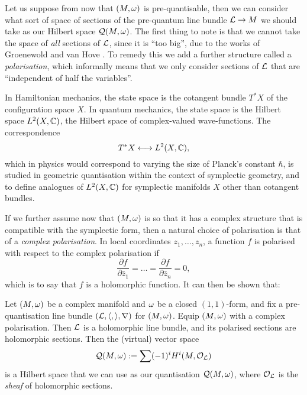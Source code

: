 Let us suppose from now that $(M,\omega)$ is pre-quantisable, then we can consider what sort of space of sections of the pre-quantum line bundle $\mathcal{L}\rightarrow M$ we should take as our Hilbert space $\mathcal{Q}(M,\omega)$. The first thing to note is that we cannot take the space of \emph{all} sections of $\mathcal{L}$, since it is ``too big'', due to the works of Groenewold \cite{Gro46} and van Hove \cite{Hov51}. To remedy this we add a further structure called a \emph{polarisation}, which informally means that we only consider sections of $\mathcal{L}$ that are ``independent of half the variables''.

\begin{rmk}
	In Hamiltonian mechanics, the state space is the cotangent bundle $T^{\ast}X$ of the configuration space $X$. In quantum mechanics, the state space is the Hilbert space $L^{2}(X,\mathbb{C})$, \ie the Hilbert space of complex-valued wave-functions. The correspondence
	\begin{equation*}
		T^{\ast}X \longleftrightarrow L^{2}(X,\mathbb{C}),
	\end{equation*}
	which in physics would correspond to varying the size of Planck's constant $\hbar$, is studied in geometric quantisation within the context of symplectic geometry, and to define analogues of $L^{2}(X,\mathbb{C})$ for symplectic manifolds $X$ other than cotangent bundles.
\end{rmk}

If we further assume now that $(M,\omega)$ is \K so that it has a complex structure that is compatible with the symplectic form, then a natural choice of polarisation is that of a \emph{complex polarisation}. In local coordinates $z_{1}, \ldots, z_{n}$, a function $f$ is polarised with respect to the complex polarisation if
\begin{equation*}
	\frac{\partial f}{\partial \bar{z}_{1}} = \ldots =  \frac{\partial f}{\partial \bar{z}_{n}} = 0,
\end{equation*}
which is to say that $f$ is a holomorphic function. It can then be shown that:

\begin{thm}
	Let $(M,\omega)$ be a complex manifold and $\omega$ be a closed $(1,1)$-form, and fix a pre-quantisation line bundle $(\mathcal{L}, \langle,\rangle, \nabla)$ for $(M,\omega)$. Equip $(M,\omega)$ with a complex polarisation. Then $\mathcal{L}$ is a holomorphic line bundle, and its polarised sections are holomorphic sections. Then the (virtual) vector space
	\begin{equation*}
		\mathcal{Q}(M,\omega) := \sum (-1)^{i}H^{i}(M,\mathcal{O}_{\mathcal{L}})
	\end{equation*}
	is a Hilbert space that we can use as our quantisation $\mathcal{Q}(M,\omega)$, where $\mathcal{O}_{\mathcal{L}}$ is the \emph{sheaf} of holomorphic sections.
\end{thm}

